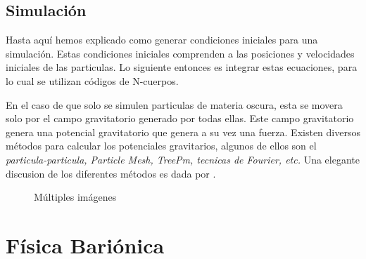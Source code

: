\subsection{Simulaci\'on}

Hasta aqu\'i hemos explicado como generar condiciones iniciales para una simulaci\'on. Estas condiciones iniciales comprenden a las posiciones y velocidades iniciales de las particulas. Lo siguiente entonces es integrar estas ecuaciones, para lo cual se utilizan c\'odigos de N-cuerpos. 

En el caso de que solo se simulen particulas de materia oscura, esta se movera solo por el campo gravitatorio generado por todas ellas. Este campo gravitatorio genera una potencial gravitatorio que genera a su vez una fuerza. Existen diversos m\'etodos para calcular los potenciales gravitarios, algunos de ellos son el \textit{particula-particula, Particle Mesh, TreePm, tecnicas de Fourier, etc.} 
Una elegante discusion de los diferentes m\'etodos es dada por \citet{SAAS}. 

\begin{figure}
 \centering
  
 \caption{Múltiples imágenes}
 \label{f:animales}
\end{figure}
 


\section{F\'isica Bari\'onica}

